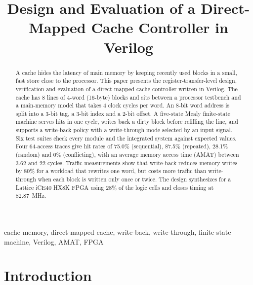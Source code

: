 \documentclass[conference]{IEEEtran}
\begin{document}
\title{Design and Evaluation of a Direct-Mapped Cache Controller in Verilog}

\author{
}

\maketitle

\begin{abstract}
A cache hides the latency of main memory by keeping recently used blocks in a small, fast store close to the processor. This paper presents the register-transfer-level design, verification and evaluation of a direct-mapped cache controller written in Verilog. The cache has 8 lines of 4-word (16-byte) blocks and sits between a processor testbench and a main-memory model that takes 4 clock cycles per word. An 8-bit word address is split into a 3-bit tag, a 3-bit index and a 2-bit offset. A five-state Mealy finite-state machine serves hits in one cycle, writes back a dirty block before refilling the line, and supports a write-back policy with a write-through mode selected by an input signal. Six test suites check every module and the integrated system against expected values. Four 64-access traces give hit rates of 75.0\% (sequential), 87.5\% (repeated), 28.1\% (random) and 0\% (conflicting), with an average memory access time (AMAT) between 3.62 and 22 cycles. Traffic measurements show that write-back reduces memory writes by 80\% for a workload that rewrites one word, but costs more traffic than write-through when each block is written only once or twice. The design synthesizes for a Lattice iCE40 HX8K FPGA using 28\% of the logic cells and closes timing at 82.87~MHz.
\end{abstract}

\begin{IEEEkeywords}
cache memory, direct-mapped cache, write-back, write-through, finite-state machine, Verilog, AMAT, FPGA
\end{IEEEkeywords}

\section{Introduction}
\end{document}
